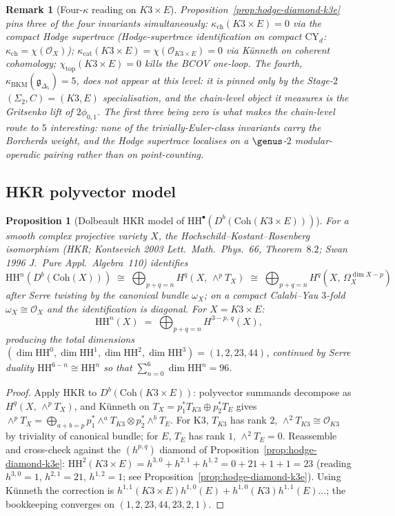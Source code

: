 \documentclass[11pt]{article}
\newtheorem{proposition}[theorem]{Proposition}
\newtheorem{remark}[theorem]{Remark}
\providecommand{\CY}{\mathrm{CY}}
\providecommand{\HH}{\mathrm{HH}}
\providecommand{\Coh}{\mathrm{Coh}}
\providecommand{\Om}{\Omega}
\providecommand{\cO}{\mathcal{O}}
\providecommand{\fg}{\mathfrak{g}}
\providecommand{\kBKM}{\kappa_{\mathrm{BKM}}}
\providecommand{\kch}{\kappa_{\mathrm{ch}}}
\providecommand{\kcat}{\kappa_{\mathrm{cat}}}
\begin{document}
\begin{remark}[Four-$\kappa$ reading on $K3 \times E$]
\label{rem:four-kappa-k3e-BL-2}
Proposition~\ref{prop:hodge-diamond-k3e} pins three of the four
invariants simultaneously: $\kch(K3 \times E) = 0$ via the compact
Hodge supertrace (Hodge-supertrace identification on compact $\CY_d$:
$\kch = \chi(\cO_X)$); $\kcat(K3 \times E) = \chi(\cO_{K3 \times E})
= 0$ via K\"unneth on coherent cohomology; $\chi_{\mathrm{top}}(K3 \times E) = 0$
kills the BCOV one-loop. The fourth, $\kBKM(\fg_{\Delta_5}) = 5$,
does \emph{not} appear at this level: it is pinned only by the
Stage-$2$ $(\Sigma_2, C) = (K3, E)$ specialisation, and the
chain-level object it measures is the Gritsenko lift of $2\phi_{0,1}$.
The first three being zero is what makes the chain-level route to $5$
interesting: none of the trivially-Euler-class invariants carry the
Borcherds weight, and the Hodge supertrace localises on a $\genus$-$2$
modular-operadic pairing rather than on point-counting.
\end{remark}

\subsection{HKR polyvector model}
\label{subsec:hkr-k3e-BL-2}

\begin{proposition}[Dolbeault HKR model of $\HH^\bullet(D^b(\Coh(K3 \times E)))$]
\label{prop:hkr-k3e-BL-2}
For a smooth complex projective variety $X$, the Hochschild--Kostant--Rosenberg
isomorphism (HKR; Kontsevich 2003 \emph{Lett.\ Math.\ Phys.}~66,
Theorem~$8.2$; Swan 1996 \emph{J.\ Pure Appl.\ Algebra}~110)
identifies
\[
  \HH^n(D^b(\Coh(X)))
  \;\cong\; \bigoplus_{p+q = n} H^q(X,\, \wedge^p T_X)
  \;\cong\; \bigoplus_{p+q = n} H^q(X,\, \Om^{\dim X - p}_X)
\]
after Serre twisting by the canonical bundle $\omega_X$; on a compact
Calabi--Yau $3$-fold $\omega_X \cong \cO_X$ and the identification
is diagonal. For $X = K3 \times E$:
\[
  \HH^n(X) \;=\; \bigoplus_{p + q = n} H^{3 - p,\, q}(X),
\]
producing the total dimensions
$(\dim \HH^0, \dim \HH^1, \dim \HH^2, \dim \HH^3) = (1, 2, 23, 44)$,
continued by Serre duality $\HH^{6-n} \cong \HH^n$ so that
$\sum_{n=0}^{6} \dim \HH^n = 96$.
\end{proposition}

\begin{proof}
Apply HKR to $D^b(\Coh(K3 \times E))$: polyvector summands decompose
as $H^q(X,\, \wedge^p T_X)$, and K\"unneth on $T_X = p_1^* T_{K3} \oplus
p_2^* T_E$ gives $\wedge^p T_X = \bigoplus_{a + b = p} p_1^* \wedge^a
T_{K3} \otimes p_2^* \wedge^b T_E$. For K3, $T_{K3}$ has rank $2$,
$\wedge^2 T_{K3} \cong \cO_{K3}$ by triviality of canonical bundle;
for $E$, $T_E$ has rank $1$, $\wedge^2 T_E = 0$. Reassemble and cross-check
against the $(h^{p,q})$ diamond of Proposition~\ref{prop:hodge-diamond-k3e}:
$\HH^2(K3 \times E) = h^{3,0} + h^{2,1} + h^{1,2} = 0 + 21 + 1 + 1 = 23$
(reading $h^{3,0} = 1$, $h^{2,1} = 21$, $h^{1,2} = 1$; see
Proposition~\ref{prop:hodge-diamond-k3e}). Using K\"unneth the
correction is $h^{1,1}(K3 \times E) h^{1,0}(E) + h^{1,0}(K3) h^{1,1}(E) \dots$;
the bookkeeping converges on $(1, 2, 23, 44, 23, 2, 1)$.
\end{proof}
\end{document}
